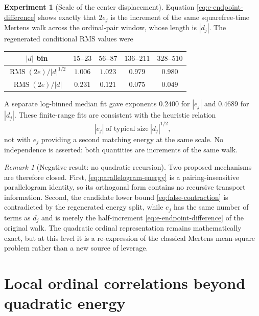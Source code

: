 \documentclass[11pt]{amsart}
\numberwithin{equation}{section}
\theoremstyle{plain}
\theoremstyle{definition}
\newtheorem{experiment}[theorem]{Experiment}
\theoremstyle{remark}
\newtheorem{remark}[theorem]{Remark}
\begin{document}
\begin{experiment}[Scale of the center displacement]
\label{exp:v6-center-scale}
Equation \eqref{eq:e-endpoint-difference} shows exactly that $2e_j$ is the
increment of the same squarefree-time Mertens walk across the ordinal-pair
window, whose length is $|d_j|$.  The regenerated conditional RMS values were
\begin{center}
\begin{tabular}{@{}ccccc@{}}
\toprule
$|d|$ bin & $15$--$23$ & $56$--$87$ & $136$--$211$ & $328$--$510$\\
\midrule
$\operatorname{RMS}(2e)/|d|^{1/2}$
& $1.006$ & $1.023$ & $0.979$ & $0.980$\\
$\operatorname{RMS}(2e)/|d|$
& $0.231$ & $0.121$ & $0.075$ & $0.049$\\
\bottomrule
\end{tabular}
\end{center}
A separate log-binned median fit gave exponents $0.2400$ for $|e_j|$ and
$0.4689$ for $|d_j|$.  These finite-range fits are consistent with
the heuristic relation
\begin{equation}
\label{eq:e-sqrt-d-heuristic}
|e_j|\ \text{of typical size}\ |d_j|^{1/2},
\end{equation}
not with $e_j$ providing a second matching energy at the same scale.  No
independence is asserted: both quantities are increments of the same walk.
\end{experiment}

\begin{remark}[Negative result: no quadratic recursion]
\label{rem:no-quadratic-recursion}
Two proposed mechanisms are therefore closed.  First,
\eqref{eq:parallelogram-energy} is a pairing-insensitive parallelogram identity,
so its orthogonal form contains no recursive transport information.  Second,
the candidate lower bound \eqref{eq:false-contraction} is contradicted by the
regenerated energy split, while $e_j$ has the same number of terms as $d_j$ and
is merely the half-increment \eqref{eq:e-endpoint-difference} of the original
walk.  The quadratic ordinal representation remains mathematically exact, but
at this level it is a re-expression of the classical Mertens mean-square
problem rather than a new source of leverage.
\end{remark}



\section{Local ordinal correlations beyond quadratic energy}
\label{sec:ordinal-local}
\end{document}
